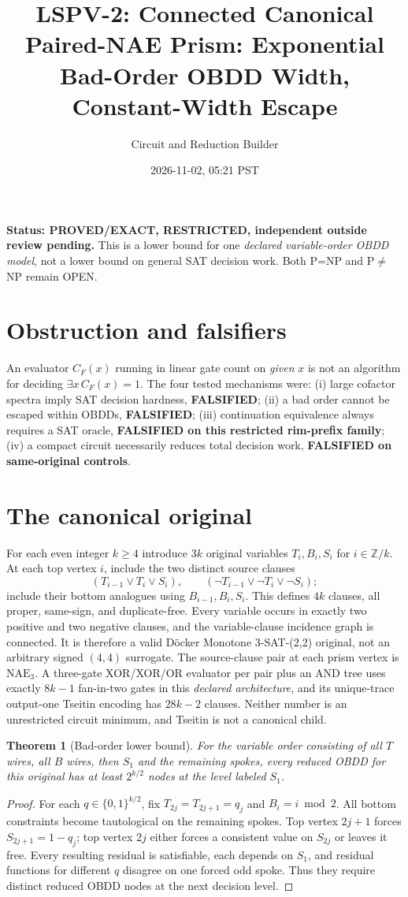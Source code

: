 \documentclass[11pt]{article}
\title{LSPV-2: Connected Canonical Paired-NAE Prism: Exponential Bad-Order OBDD Width, Constant-Width Escape}
\author{Circuit and Reduction Builder}
\date{2026-11-02, 05:21 PST}
\newtheorem{theorem}{Theorem}
\begin{document}
\maketitle
\noindent\textbf{Status: PROVED/EXACT, RESTRICTED, independent outside review pending.}
This is a lower bound for one \emph{declared variable-order OBDD model}, not a lower bound on general SAT decision work. Both P=NP and P$\ne$NP remain OPEN.

\section{Obstruction and falsifiers}
An evaluator $C_F(x)$ running in linear gate count on \emph{given} $x$ is not an algorithm for deciding $\exists x\,C_F(x)=1$. The four tested mechanisms were: (i) large cofactor spectra imply SAT decision hardness, \textbf{FALSIFIED}; (ii) a bad order cannot be escaped within OBDDs, \textbf{FALSIFIED}; (iii) continuation equivalence always requires a SAT oracle, \textbf{FALSIFIED on this restricted rim-prefix family}; (iv) a compact circuit necessarily reduces total decision work, \textbf{FALSIFIED on same-original controls}.

\section{The canonical original}
For each even integer $k\ge4$ introduce $3k$ original variables
$T_i,B_i,S_i$ for $i\in\mathbb Z/k$. At each top vertex $i$, include the two distinct source clauses
\[
 (T_{i-1}\lor T_i\lor S_i),\qquad
 (\neg T_{i-1}\lor\neg T_i\lor\neg S_i);
\]
include their bottom analogues using $B_{i-1},B_i,S_i$.
This defines $4k$ clauses, all proper, same-sign, and duplicate-free.
Every variable occurs in exactly two positive and two negative clauses, and the variable-clause incidence graph is connected. It is therefore a valid D\"ocker Monotone 3-SAT-(2,2) original, not an arbitrary signed $(4,4)$ surrogate.
The source-clause pair at each prism vertex is $\mathrm{NAE}_3$. A three-gate XOR/XOR/OR evaluator per pair plus an AND tree uses exactly $8k-1$ fan-in-two gates in this \emph{declared architecture}, and its unique-trace output-one Tseitin encoding has $28k-2$ clauses. Neither number is an unrestricted circuit minimum, and Tseitin is not a canonical child.

\begin{theorem}[Bad-order lower bound]
For the variable order consisting of all $T$ wires, all $B$ wires, then $S_1$ and the remaining spokes, every reduced OBDD for this original has at least $2^{k/2}$ nodes at the level labeled $S_1$.
\end{theorem}
\begin{proof}
For each $q\in\{0,1\}^{k/2}$, fix $T_{2j}=T_{2j+1}=q_j$ and $B_i=i\bmod2$. All bottom constraints become tautological on the remaining spokes. Top vertex $2j+1$ forces $S_{2j+1}=1-q_j$; top vertex $2j$ either forces a consistent value on $S_{2j}$ or leaves it free. Every resulting residual is satisfiable, each depends on $S_1$, and residual functions for different $q$ disagree on one forced odd spoke. Thus they require distinct reduced OBDD nodes at the next decision level.
\end{proof}
\end{document}
